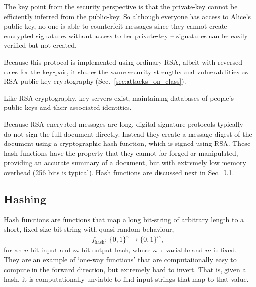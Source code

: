The key point from the security perspective is that the private-key cannot be efficiently inferred from the public-key. So although everyone has access to Alice's public-key, no one is able to counterfeit messages since they cannot create encrypted signatures without access to her private-key -- signatures can be easily verified but not created.

Because this protocol is implemented using ordinary RSA, albeit with reversed roles for the key-pair, it shares the same security strengths and vulnerabilities as RSA public-key cryptography (Sec.~\ref{sec:attacks_on_class}).

Like RSA cryptography, key servers exist, maintaining databases of people's public-keys and their associated identities.

Because RSA-encrypted messages are long, digital signature protocols typically do not sign the full document directly. Instead they create a message digest of the document using a cryptographic hash function, which is signed using RSA. These hash functions have the property that they cannot for forged or manipulated, providing an accurate summary of a document, but with extremely low memory overhead (256 bits is typical). Hash functions are discussed next in Sec.~\ref{sec:hashing}.

%
%

\subsection{Hashing} \label{sec:hashing} 

Hash functions are functions that map a long bit-string of arbitrary length to a short, fixed-size bit-string with quasi-random behaviour,
\begin{align}
	f_\mathrm{hash}:\,\{0,1\}^n \to \{0,1\}^m,
\end{align}
for an $n$-bit input and $m$-bit output hash, where $n$ is variable and $m$ is fixed. They are an example of `one-way functions' that are computationally easy to compute in the forward direction, but extremely hard to invert. That is, given a hash, it is computationally unviable to find input strings that map to that value.

